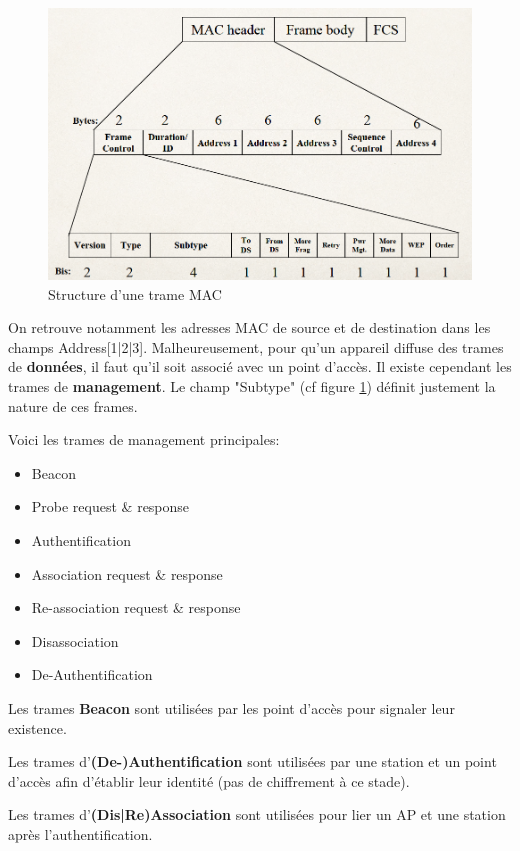 \begin{figure}[H]
	\centering
	\includegraphics[width=14cm]{images/probe/mac_frame.png}
	\caption{Structure d'une trame MAC}
	\label{fig:macframe}
\end{figure}

On retrouve notamment les adresses MAC de source et de destination dans les champs Address[1|2|3].
Malheureusement, pour qu'un appareil diffuse des trames de \textbf{données}, il faut qu'il soit associé avec un point d'accès. 
Il existe cependant les trames de \textbf{management}. Le champ "Subtype" (cf figure \ref{fig:macframe}) définit justement
la nature de ces frames. 

Voici les trames de management principales:
\begin{itemize}
    \item Beacon
    \item Probe request \& response
    \item Authentification
    \item Association request \& response
    \item Re-association request \& response
    \item Disassociation
    \item De-Authentification
\end{itemize}

Les trames \textbf{Beacon} sont utilisées par les point d'accès pour signaler leur existence. 

Les trames d'\textbf{(De-)Authentification} sont utilisées par une station et un point d'accès afin d'établir leur identité (pas de chiffrement à ce stade).

Les trames d'\textbf{(Dis|Re)Association} sont utilisées pour lier un AP et une station après l'authentification.


